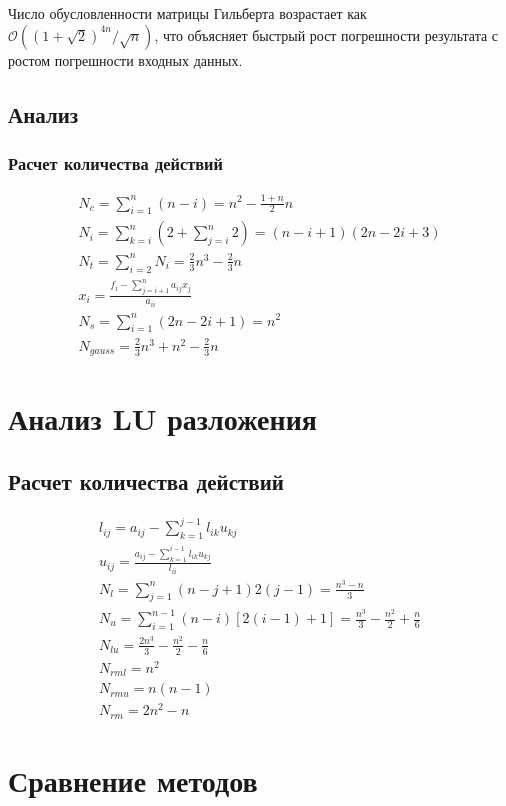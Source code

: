 \documentclass[12pt, a4paper]{article}
\begin{document}
Число обусловленности матрицы Гильберта возрастает 
как $\mathcal{O}((1+\sqrt{2})^{4n}/\sqrt{n})$, что объясняет быстрый рост
погрешности результата с ростом погрешности входных данных.

\subsection{Анализ}
\subsubsection{Расчет количества действий}

\begin{gather}
  N_c = \sum_{i=1}^{n}(n-i) = n^2 - \frac{1+n}{2}n \\
  N_i = \sum_{k=i}^{n}(2 + \sum_{j=i}^{n}2) = (n-i+1)(2n-2i+3) \\
  N_t = \sum_{i=2}^{n}N_i = \frac{2}{3}n^3-\frac{2}{3}n \\
  x_i = \frac{f_i - \sum_{j=i+1}^{n}a_{ij}x_j}{a_{ii}} \\
  N_s = \sum_{i=1}^{n}(2n-2i+1) = n^2 \\
  N_{gauss} = \frac{2}{3}n^3 + n^2 -\frac{2}{3}n
\end{gather}

\section{Анализ LU разложения}
\subsection{Расчет количества действий}

\begin{gather}
  l_{ij} = a_{ij} - \sum_{k=1}^{j-1}l_{ik}u_{kj} \\
  u_{ij} = \frac{a_{ij} - \sum_{k=1}^{i-1}l_{ik}u_{kj}}{l_{ii}} \\
  N_l = \sum_{j=1}^{n}(n-j+1)2(j-1) = \frac{n^3-n}{3} \\
  N_u = \sum_{i=1}^{n-1}(n-i)[2(i-1)+1] = \frac{n^3}{3}-\frac{n^2}{2}+\frac{n}{6} \\
  N_{lu} = \frac{2n^3}{3}-\frac{n^2}{2}-\frac{n}{6} \\
  N_{rml} = n^2 \\
  N_{rmu} = n(n-1) \\
  N_{rm} = 2n^2 - n
\end{gather}

\section{Сравнение методов}
\end{document}
